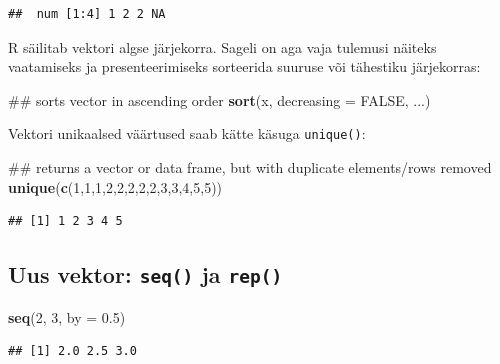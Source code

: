 \documentclass[]{book}
\newenvironment{Shaded}{\begin{snugshade}}{\end{snugshade}}
\newcommand{\KeywordTok}[1]{\textcolor[rgb]{0.13,0.29,0.53}{\textbf{#1}}}
\newcommand{\DataTypeTok}[1]{\textcolor[rgb]{0.13,0.29,0.53}{#1}}
\newcommand{\DecValTok}[1]{\textcolor[rgb]{0.00,0.00,0.81}{#1}}
\newcommand{\FloatTok}[1]{\textcolor[rgb]{0.00,0.00,0.81}{#1}}
\newcommand{\OtherTok}[1]{\textcolor[rgb]{0.56,0.35,0.01}{#1}}
\newcommand{\NormalTok}[1]{#1}
\begin{document}
\begin{verbatim}
##  num [1:4] 1 2 2 NA
\end{verbatim}

R säilitab vektori algse järjekorra. Sageli on aga vaja tulemusi näiteks
vaatamiseks ja presenteerimiseks sorteerida suuruse või tähestiku
järjekorras:

\begin{Shaded}
\begin{Highlighting}[]
\NormalTok{## sorts vector in ascending order}
\KeywordTok{sort}\NormalTok{(x, }\DataTypeTok{decreasing =} \OtherTok{FALSE}\NormalTok{, ...)}
\end{Highlighting}
\end{Shaded}

Vektori unikaalsed väärtused saab kätte käsuga \texttt{unique()}:

\begin{Shaded}
\begin{Highlighting}[]
\NormalTok{## returns a vector or data frame, but with duplicate elements/rows removed}
\KeywordTok{unique}\NormalTok{(}\KeywordTok{c}\NormalTok{(}\DecValTok{1}\NormalTok{,}\DecValTok{1}\NormalTok{,}\DecValTok{1}\NormalTok{,}\DecValTok{2}\NormalTok{,}\DecValTok{2}\NormalTok{,}\DecValTok{2}\NormalTok{,}\DecValTok{2}\NormalTok{,}\DecValTok{2}\NormalTok{,}\DecValTok{3}\NormalTok{,}\DecValTok{3}\NormalTok{,}\DecValTok{4}\NormalTok{,}\DecValTok{5}\NormalTok{,}\DecValTok{5}\NormalTok{))}
\end{Highlighting}
\end{Shaded}

\begin{verbatim}
## [1] 1 2 3 4 5
\end{verbatim}

\subsection{\texorpdfstring{Uus vektor: \texttt{seq()} ja
\texttt{rep()}}{Uus vektor: seq() ja rep()}}\label{uus-vektor-seq-ja-rep}

\begin{Shaded}
\begin{Highlighting}[]
\KeywordTok{seq}\NormalTok{(}\DecValTok{2}\NormalTok{, }\DecValTok{3}\NormalTok{, }\DataTypeTok{by =} \FloatTok{0.5}\NormalTok{)}
\end{Highlighting}
\end{Shaded}

\begin{verbatim}
## [1] 2.0 2.5 3.0
\end{verbatim}
\end{document}
